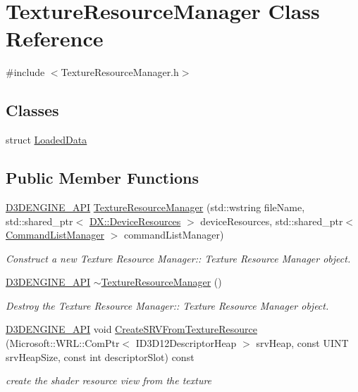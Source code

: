 \hypertarget{class_texture_resource_manager}{}\section{Texture\+Resource\+Manager Class Reference}
\label{class_texture_resource_manager}


{\ttfamily \#include $<$Texture\+Resource\+Manager.\+h$>$}

\subsection*{Classes}
\begin{DoxyCompactItemize}
\item 
struct \mbox{\hyperlink{struct_texture_resource_manager_1_1_loaded_data}{Loaded\+Data}}
\end{DoxyCompactItemize}
\subsection*{Public Member Functions}
\begin{DoxyCompactItemize}
\item 
\mbox{\hyperlink{stdafx_8h_a8ee2d990c5dfba7794dd2b60741d7722}{D3\+D\+E\+N\+G\+I\+N\+E\+\_\+\+A\+PI}} \mbox{\hyperlink{class_texture_resource_manager_ad6183400787dbb2be43b0cb31edd5650}{Texture\+Resource\+Manager}} (std\+::wstring file\+Name, std\+::shared\+\_\+ptr$<$ \mbox{\hyperlink{class_d_x_1_1_device_resources}{D\+X\+::\+Device\+Resources}} $>$ device\+Resources, std\+::shared\+\_\+ptr$<$ \mbox{\hyperlink{class_command_list_manager}{Command\+List\+Manager}} $>$ command\+List\+Manager)
\begin{DoxyCompactList}\small\item\em Construct a new Texture Resource Manager\+:\+: Texture Resource Manager object. \end{DoxyCompactList}\item 
\mbox{\hyperlink{stdafx_8h_a8ee2d990c5dfba7794dd2b60741d7722}{D3\+D\+E\+N\+G\+I\+N\+E\+\_\+\+A\+PI}} \mbox{\hyperlink{class_texture_resource_manager_ac83cdfafe8c418e18e26490b2b505ef5}{$\sim$\+Texture\+Resource\+Manager}} ()
\begin{DoxyCompactList}\small\item\em Destroy the Texture Resource Manager\+:\+: Texture Resource Manager object. \end{DoxyCompactList}\item 
\mbox{\hyperlink{stdafx_8h_a8ee2d990c5dfba7794dd2b60741d7722}{D3\+D\+E\+N\+G\+I\+N\+E\+\_\+\+A\+PI}} void \mbox{\hyperlink{class_texture_resource_manager_ad7d780da205f6144058a3ba1882ad5de}{Create\+S\+R\+V\+From\+Texture\+Resource}} (Microsoft\+::\+W\+R\+L\+::\+Com\+Ptr$<$ I\+D3\+D12\+Descriptor\+Heap $>$ srv\+Heap, const U\+I\+NT srv\+Heap\+Size, const int descriptor\+Slot) const
\begin{DoxyCompactList}\small\item\em create the shader resource view from the texture \end{DoxyCompactList}\end{DoxyCompactItemize}
